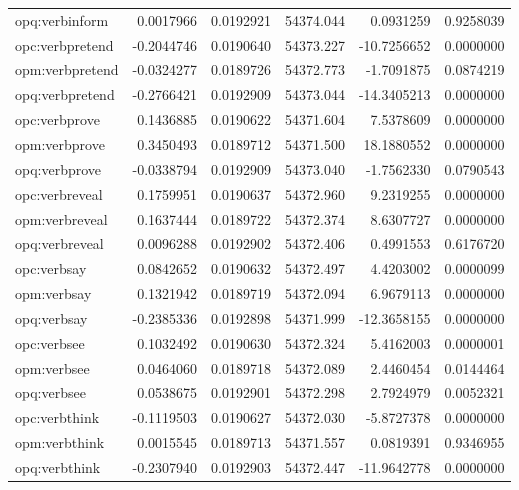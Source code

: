 \documentclass[12pt, a4paper]{article}
\begin{document}
\begin{table}[ht]
\begin{tabular}{lrrrrr}
		opq:verbinform & 0.0017966 & 0.0192921 & 54374.044 & 0.0931259 & 0.9258039\\
		opc:verbpretend & -0.2044746 & 0.0190640 & 54373.227 & -10.7256652 & 0.0000000\\
		opm:verbpretend & -0.0324277 & 0.0189726 & 54372.773 & -1.7091875 & 0.0874219\\
		opq:verbpretend & -0.2766421 & 0.0192909 & 54373.044 & -14.3405213 & 0.0000000\\
		\addlinespace
		opc:verbprove & 0.1436885 & 0.0190622 & 54371.604 & 7.5378609 & 0.0000000\\
		opm:verbprove & 0.3450493 & 0.0189712 & 54371.500 & 18.1880552 & 0.0000000\\
		opq:verbprove & -0.0338794 & 0.0192909 & 54373.040 & -1.7562330 & 0.0790543\\
		opc:verbreveal & 0.1759951 & 0.0190637 & 54372.960 & 9.2319255 & 0.0000000\\
		opm:verbreveal & 0.1637444 & 0.0189722 & 54372.374 & 8.6307727 & 0.0000000\\
		\addlinespace
		opq:verbreveal & 0.0096288 & 0.0192902 & 54372.406 & 0.4991553 & 0.6176720\\
		opc:verbsay & 0.0842652 & 0.0190632 & 54372.497 & 4.4203002 & 0.0000099\\
		opm:verbsay & 0.1321942 & 0.0189719 & 54372.094 & 6.9679113 & 0.0000000\\
		opq:verbsay & -0.2385336 & 0.0192898 & 54371.999 & -12.3658155 & 0.0000000\\
		opc:verbsee & 0.1032492 & 0.0190630 & 54372.324 & 5.4162003 & 0.0000001\\
		\addlinespace
		opm:verbsee & 0.0464060 & 0.0189718 & 54372.089 & 2.4460454 & 0.0144464\\
		opq:verbsee & 0.0538675 & 0.0192901 & 54372.298 & 2.7924979 & 0.0052321\\
		opc:verbthink & -0.1119503 & 0.0190627 & 54372.030 & -5.8727378 & 0.0000000\\
		opm:verbthink & 0.0015545 & 0.0189713 & 54371.557 & 0.0819391 & 0.9346955\\
		opq:verbthink & -0.2307940 & 0.0192903 & 54372.447 & -11.9642778 & 0.0000000\\
		\bottomrule
	\end{tabular}
\end{table}


\end{document}
